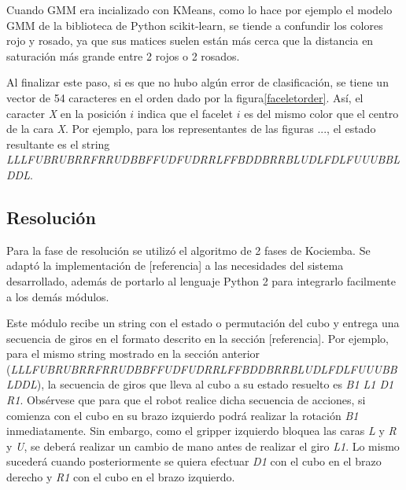 Cuando GMM era incializado con KMeans, como lo hace por ejemplo el modelo GMM de la biblioteca de Python scikit-learn, se tiende a confundir los colores rojo y rosado, ya que sus matices suelen están más cerca que la distancia en saturación más grande entre 2 rojos o 2 rosados.

Al finalizar este paso, si es que no hubo algún error de clasificación, se tiene un vector de 54 caracteres en el orden dado por la figura\ref{faceletorder}. Así, el caracter \textit{X} en la posición $i$ indica que el facelet $i$ es del mismo color que el centro de la cara \textit{X}. Por ejemplo, para los representantes de las figuras ..., el estado resultante es el string \textit{LLLFUBRUBRRFRRUDBBFFUDFUDRRLFFBDDBRRBLUDLFDLFUUUBBLDDL}.


\subsection{Resolución}
Para la fase de resolución se utilizó el algoritmo de 2 fases de Kociemba. Se adaptó la implementación de [referencia] a las necesidades del sistema desarrollado, además de portarlo al lenguaje Python 2 para integrarlo facilmente a los demás módulos.

Este módulo recibe un string con el estado o permutación del cubo y entrega una secuencia de giros en el formato descrito en la sección [referencia]. Por ejemplo, para el mismo string mostrado en la sección anterior (\textit{LLLFUBRUBRRFRRUDBBFFUDFUDRRLFFBDDBRRBLUDLFDLFUUUBBLDDL}), la secuencia de giros que lleva al cubo a su estado resuelto es \textit{B1 L1 D1 R1}. Obsérvese que para que el robot realice dicha secuencia de acciones, si comienza con el cubo en su brazo izquierdo podrá realizar la rotación \textit{B1} inmediatamente. Sin embargo, como el gripper izquierdo bloquea las caras \textit{L} y \textit{R} y \textit{U}, se deberá realizar un cambio de mano antes de realizar el giro \textit{L1}. Lo mismo sucederá cuando posteriormente se quiera efectuar \textit{D1} con el cubo en el brazo derecho y \textit{R1} con el cubo en el brazo izquierdo.


